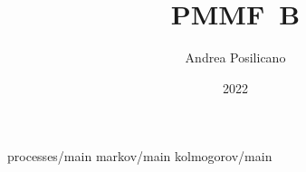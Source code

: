 \usepackage	{PMMF-style/style}

\title	{PMMF~B}
\author	{Andrea Posilicano}
\date	{2022}


\maketitle
	{processes/main}
	{markov/main}
\appendix
	{kolmogorov/main}

